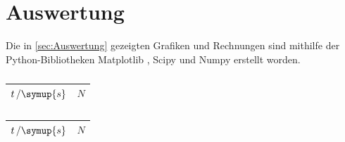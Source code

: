\section{Auswertung}
\label{sec:Auswertung}
Die in \autoref{sec:Auswertung} gezeigten Grafiken und Rechnungen sind mithilfe der Python-Bibliotheken Matplotlib \cite{matplotlib}, Scipy \cite{scipy} und Numpy \cite{numpy}
erstellt worden.


\begin{table}[H]
  \centering
  \caption{}
  \begin{tabular}{S[table-format=3] S[table-format=2(2)]}
      \toprule
      {$t\,/\symup{s}$} & {$N$} \\
      \midrule

      \bottomrule
  \end{tabular}
  \begin{tabular}{S[table-format=3] S[table-format=2(2)]}
      \toprule
      {$t\,/\symup{s}$} & {$N$} \\
      \midrule
      
      \bottomrule
  \end{tabular}
  \label{tab:}
\end{table}


